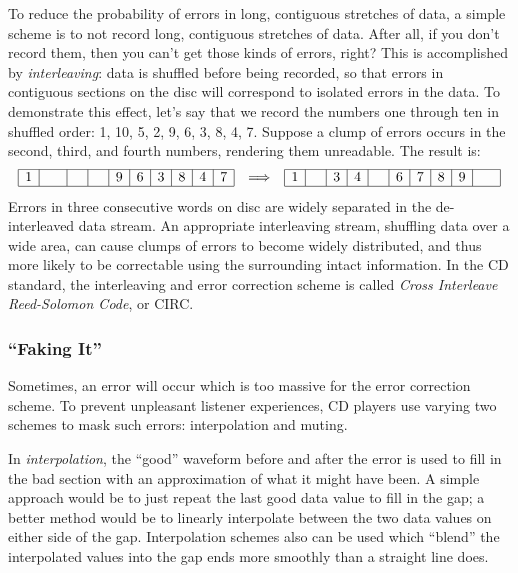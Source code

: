 To reduce the probability of errors in long, contiguous stretches of
data, a simple scheme is to not record long, contiguous stretches of
data.  After all, if you don't record them, then you can't get those
kinds of errors, right? This is accomplished by \emph{interleaving}:
data is shuffled before being recorded, so that errors in contiguous
sections on the disc will correspond to isolated errors in the
data. To demonstrate this effect, let's say that we record the numbers
one through ten in shuffled order: 1, 10, 5, 2, 9, 6, 3, 8, 4,
7. Suppose a clump of errors occurs in the second, third, and fourth
numbers, rendering them unreadable. The result is:
\begin{displaymath}
\begin{array}{rcl}
\begin{array}{|c|c|c|c|c|c|c|c|c|c|}\hline
1 & \hphantom{10}  & \hphantom{5} & \hphantom{2} & 9 & 6 & 3 & 8 & 4 & 7 \\ \hline
\end{array} &
\Longrightarrow &
\begin{array}{|c|c|c|c|c|c|c|c|c|c|}\hline
1 & \hphantom{2} & 3 & 4 & \hphantom{5}  & 6 & 7 & 8 & 9 & \hphantom{10}\\ \hline
\end{array}
\end{array}
\end{displaymath}
Errors in three consecutive words on disc are widely separated in the
de-interleaved data stream. An appropriate interleaving stream,
shuffling data over a wide area, can cause clumps of errors to become
widely distributed, and thus more likely to be correctable using the
surrounding intact information. In the CD standard, the interleaving
and error correction scheme is called \emph{Cross Interleave
Reed-Solomon Code}, or CIRC.

\subsubsection{``Faking It''}

Sometimes, an error will occur which is too massive for the error
correction scheme. To prevent unpleasant listener experiences, CD
players use varying two schemes to mask such errors: interpolation and
muting.

In \emph{interpolation}, the ``good'' waveform before and after the
error is used to fill in the bad section with an approximation of what
it might have been. A simple approach would be to just repeat the last
good data value to fill in the gap; a better method would be to
linearly interpolate between the two data values on either side of the
gap. Interpolation schemes also can be used which ``blend'' the
interpolated values into the gap ends more smoothly than a straight
line does.

